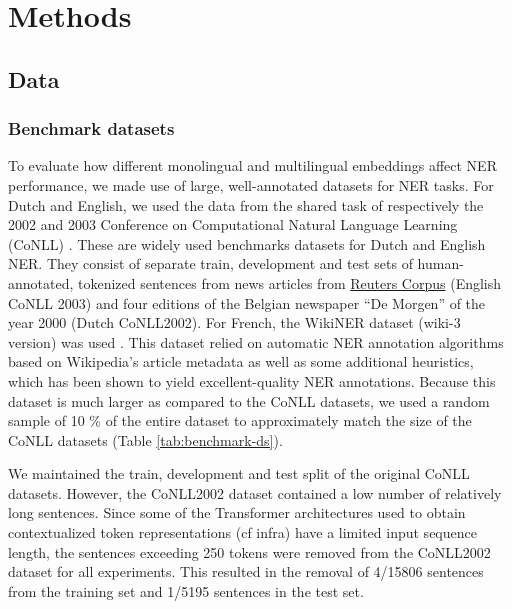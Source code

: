 \documentclass[12pt,a4paper,]{book}
\begin{document}
\hypertarget{methods}{%
\chapter{Methods}\label{methods}}

\hypertarget{data}{%
\section{Data}\label{data}}

\hypertarget{benchmark-datasets}{%
\subsection{Benchmark datasets}\label{benchmark-datasets}}

To evaluate how different monolingual and multilingual embeddings affect NER performance, we made use of large, well-annotated datasets for NER tasks. For Dutch and English, we used the data from the shared task of respectively the 2002 and 2003 Conference on Computational Natural Language Learning (CoNLL) \citep{tjongkimsang2002, tjongkimsang2003}. These are widely used benchmarks datasets for Dutch and English NER. They consist of separate train, development and test sets of human-annotated, tokenized sentences from news articles from \href{https://trec.nist.gov/data/reuters/reuters.html}{Reuters Corpus} (English CoNLL 2003) and four editions of the Belgian newspaper ``De Morgen'' of the year 2000 (Dutch CoNLL2002). For French, the WikiNER dataset (wiki-3 version) was used \citep{nothman2013}. This dataset relied on automatic NER annotation algorithms based on Wikipedia's article metadata as well as some additional heuristics, which has been shown to yield excellent-quality NER annotations. Because this dataset is much larger as compared to the CoNLL datasets, we used a random sample of 10 \% of the entire dataset to approximately match the size of the CoNLL datasets (Table \ref{tab:benchmark-ds}).

We maintained the train, development and test split of the original CoNLL datasets. However, the CoNLL2002 dataset contained a low number of relatively long sentences. Since some of the Transformer architectures used to obtain contextualized token representations (cf infra) have a limited input sequence length, the sentences exceeding 250 tokens were removed from the CoNLL2002 dataset for all experiments. This resulted in the removal of 4/15806 sentences from the training set and 1/5195 sentences in the test set.
\end{document}
